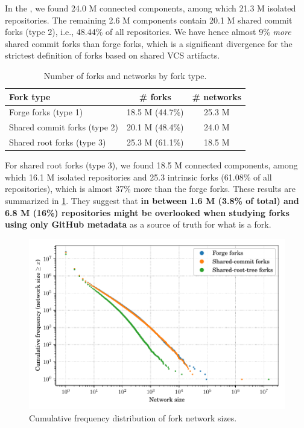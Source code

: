 In the \SWHGD{}, we found 24.0 M connected components, among which 21.3 M
isolated repositories. The remaining 2.6 M components contain 20.1 M shared
commit forks (type 2), i.e., 48.44\% of all repositories. We have hence almost
9\% \emph{more} shared commit forks than forge forks, which is a significant
divergence for the strictest definition of forks based on shared VCS
artifacts.

\begin{table}[t]
    \centering
    \caption{Number of forks and networks by fork type.}%
    \label{tab:fork-network-results}
    \begin{tabular}{l|c|c}
      \textbf{Fork type} & \textbf{\# forks} & \textbf{\# networks} \\
      \hline
      Forge forks (type 1)         & 18.5 M (44.7\%) & 25.3 M \\
      Shared commit forks (type 2) & 20.1 M (48.4\%) & 24.0 M \\
      Shared root forks (type 3)   & 25.3 M (61.1\%) & 18.5 M \\
    \end{tabular}
\end{table}

For shared root forks (type 3), we found 18.5 M connected components, among
which 16.1 M isolated repositories and 25.3 intrinsic forks (61.08\% of all
repositories), which is almost 37\% more than the forge forks. These results
are summarized in \cref{tab:fork-network-results}.  They suggest that
\textbf{in between 1.6 M (3.8\% of total) and 6.8 M (16\%) repositories might
  be overlooked when studying forks using only GitHub metadata} as a source of
truth for what is a fork.

\begin{figure}[t]
    \centering
    \includegraphics[width=0.8\linewidth]{img/forks/fork-network-freq-distribution.pdf}
    \caption{Cumulative frequency distribution of fork network sizes.}%
    \label{fig:fork-network-freq-distrib}
\end{figure}

